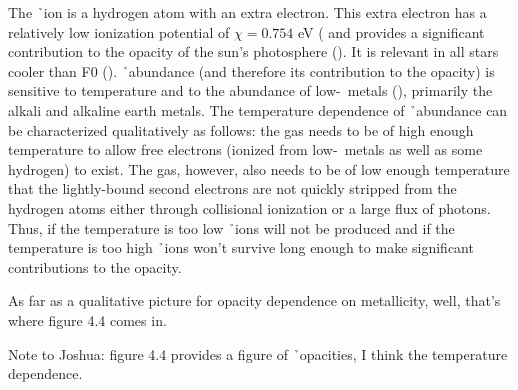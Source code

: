 
The \h\ ion is a hydrogen atom with an extra electron.  This extra electron
has a relatively low ionization potential of $\chi = 0.754$ eV
(\citealt{carroll2007introduction} and
provides a significant contribution to the opacity of the sun's
photosphere (\citealt{ryden2010foundations}).  It is relevant in all
stars cooler than F0 (\citealt{carroll2007introduction}). \h\
abundance (and therefore its contribution to the opacity) is sensitive 
to temperature and to the abundance of low-\chii\ metals
(\citealt{hansen1994stellar}), primarily the alkali and alkaline earth metals.  The temperature dependence of \h\
abundance can be characterized qualitatively as follows: the gas needs
to be of high enough temperature to allow free electrons (ionized from
low-\chii\ metals as well as some hydrogen) to exist.  The gas,
however, also needs to be of low enough temperature that the
lightly-bound second electrons are not quickly stripped from the
hydrogen atoms either through collisional ionization or a large flux
of photons.  Thus, if the temperature is too low \h\ ions will not be
produced and if the temperature is too high \h\ ions won't survive
long enough to make significant contributions to the opacity.

As far as a qualitative picture for opacity dependence on metallicity,
well, that's where figure 4.4 comes in.

Note to Joshua:  \cite{hansen1994stellar} figure 4.4 provides a figure
of \h\ opacities, I think the temperature dependence.
